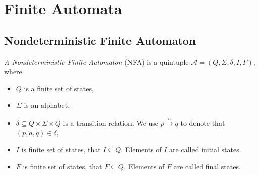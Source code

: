 \section{Finite Automata}
\label{defFA}

	\subsection{Nondeterministic Finite Automaton}
	\label{defNFA}
		\emph{A Nondeterministic Finite Automaton} (NFA) is a quintuple $\mathcal{A}=(Q,\Sigma,\delta,I,F)$, where
		\begin{itemize}
			\item $Q$ is a finite set of states,
			\item $\Sigma$ is an alphabet,
			\item $\delta \subseteq Q \times \Sigma \times Q$ is a transition relation. We use $p \xrightarrow{a} q$ to denote that $(p,a,q)\in\delta$,
			\item $I$ is finite set of states, that $I \subseteq Q$. Elements of $I$ are called initial states.
			\item $F$ is finite set of states, that $F \subseteq Q$. Elements of $F$ are called final states.
		\end{itemize}

